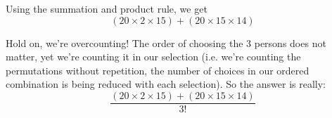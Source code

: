 \documentclass[10pt,a4paper,final]{article}
\begin{document}
\begin{enumerate}
Using the summation and product rule, we get
\begin{equation*}
(20 \times 2 \times 15)+(20 \times 15 \times 14)
\end{equation*}

Hold on, we're overcounting! The order of choosing the 3 persons does not matter,
yet we're counting it in our selection (i.e. we're counting the permutations without repetition,
the number of choices in our ordered combination is being reduced with each selection).
So the answer is really:
\begin{equation*}
\frac{(20 \times 2 \times 15)+(20 \times 15 \times 14)}{3!}
\end{equation*}

\end{enumerate}
\end{document}
